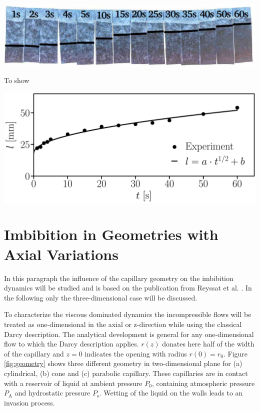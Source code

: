 \documentclass[aip, amsmath, amssymb, reprint, twocolumn, floatfix]{revtex4-1}
\newcommand{\Pa}{P_\mathrm{A}}
\newcommand{\Ps}{P_\mathrm{s}}
\begin{document}
\begin{center}
	\captionsetup{type=figure}
	\includegraphics[width = \linewidth]{../pictures/experiments/filter-paper_water_1s-60s_backlight.pdf}
	\label{fig:imbibition-height}
\end{center}

To show 

\begin{center}
	\captionsetup{type=figure}
	\includegraphics[width = \linewidth]{../pictures/experiments/filter-paper_water_1s-60s_eval_offset.pdf}
	\label{fig:imbibition-height}
\end{center}

\section{Imbibition in Geometries with Axial Variations}
\label{sec:geometry}

In this paragraph the influence of the capillary geometry on the imbibition dynamics will be studied and is based on the publication from Reyssat et al. \cite{Reyssat2008}. In the following only the three-dimensional case will be discussed.
\bigskip

To characterize the viscous dominated dynamics the incompressible flows will be treated as one-dimensional in the axial or z-direction while using the classical Darcy description. The analytical development is general for any one-dimensional flow to which the Darcy description applies. $r(z)$ donates here half of the width of the capillary and $z = 0$ indicates the opening with radius $r(0) = r_0$. Figure \ref{fig:geometry} shows three different geometry in two-dimensional plane for (a) cylindrical, (b) cone and (c) parabolic capillary. These capillaries are in contact with a reservoir of liquid at ambient pressure $P_0$, containing atmospheric pressure $\Pa$ and hydrostatic pressure $\Ps$. Wetting of the liquid on the walls leads to an invasion process.
\end{document}
